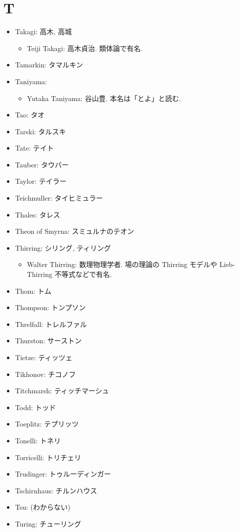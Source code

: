 \documentclass[openany, a4paper, oneside]{jsbook}
\begin{document}
\section{T}

\begin{itemize}
\item Takagi: 高木, 高城
\begin{itemize}
\item Teiji Takagi: 高木貞治. 類体論で有名.
\end{itemize}
\item Tamarkin: タマルキン
\item Taniyama:
\begin{itemize}
\item Yutaka Taniyama: 谷山豊. 本名は「とよ」と読む.
\end{itemize}
\item Tao: タオ
\item Tarski: タルスキ
\item Tate: テイト
\item Tauber: タウバー
\item Taylor: テイラー
\item Teichmuller: タイヒミュラー
\item Thales: タレス
\item Theon of Smyrna: スミュルナのテオン
\item Thirring: シリング, ティリング
\begin{itemize}
\item Walter Thirring: 数理物理学者. 場の理論の Thirring モデルや Lieb-Thirring 不等式などで有名.
\end{itemize}
\item Thom: トム
\item Thompson: トンプソン
\item Threlfall: トレルファル
\item Thurston: サーストン
\item Tietze: ティッツェ
\item Tikhonov: チコノフ
\item Titchmarsh: ティッチマーシュ
\item Todd: トッド
\item Toeplitz: テプリッツ
\item Tonelli: トネリ
\item Torricelli: トリチェリ
\item Trudinger: トゥルーディンガー
\item Tschirnhaus: チルンハウス
\item Tsu: (わからない)
\item Turing: チューリング
\end{itemize}
\end{document}
